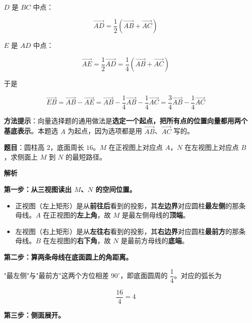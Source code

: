 $D$ 是 $BC$ 中点：

\[\overrightarrow{AD}=\frac12\left(\overrightarrow{AB}+\overrightarrow{AC}\right)\]

$E$ 是 $AD$ 中点：

\[\overrightarrow{AE}=\frac12\overrightarrow{AD}=\frac14\left(\overrightarrow{AB}+\overrightarrow{AC}\right)\]

于是

\[\overrightarrow{EB}=\overrightarrow{AB}-\overrightarrow{AE}=\overrightarrow{AB}-\frac14\overrightarrow{AB}-\frac14\overrightarrow{AC}=\frac34\overrightarrow{AB}-\frac14\overrightarrow{AC}\]


\begin{gktip}
\textbf{方法提示}：向量选择题的通用做法是\textbf{选定一个起点，把所有点的位置向量都用两个基底表示}。本题选 $A$ 为起点，因为选项都是用 $\overrightarrow{AB}$、$\overrightarrow{AC}$ 写的。
\end{gktip}

\par\medskip


\textbf{题目}：圆柱高 $2$，底面周长 $16$。$M$ 在正视图上对应点 $A$，$N$ 在左视图上对应点 $B$，求侧面上 $M$ 到 $N$ 的最短路径。

\begin{center}\end{center}

\textbf{解析}

\textbf{第一步：从三视图读出 $M$、$N$ 的空间位置。}

\begin{itemize}
\item 正视图（左上矩形）是从\textbf{前往后}看到的投影，其\textbf{左边界}对应圆柱\textbf{最左侧}的那条母线。$A$ 在正视图的\textbf{左上角}，故 $M$ 是最左侧母线的\textbf{顶端}。
\item 左视图（右上矩形）是从\textbf{左往右}看到的投影，其\textbf{右边界}对应圆柱\textbf{最前方}的那条母线。$B$ 在左视图的\textbf{右下角}，故 $N$ 是最前方母线的\textbf{底端}。
\end{itemize}

\textbf{第二步：算两条母线在底面圆上的角距离。}

"最左侧"与"最前方"这两个方位相差 $90^\circ$，即底面圆周的 $\dfrac14$。对应的弧长为

\[\frac{16}4=4\]

\textbf{第三步：侧面展开。}

